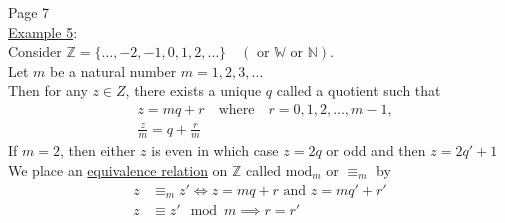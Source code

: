 \documentclass{article}
\begin{document}
\newpage
\begin{flushleft}
    Page 7 \\
    \vspace{1em}
    \underline{Example 5}: \\
    \vspace{1em}
    Consider $\mathbb{Z} = \{ \ldots, -2, -1, 0, 1, 2, \ldots \} \quad (\text{ or } \mathbb{W} \text{ or } \mathbb{N})$. \\
    \vspace{0.5em}
    Let $m$ be a natural number $m = 1,2,3,\ldots$ \\
    \vspace{0.5em}
    Then for any $z \in Z$, there exists a unique $q$ called a quotient such that \begin{align*}
    &\boxed{z = mq + r} \quad \text{where} \quad r = 0, 1, 2, \ldots, m-1, \\
    &\frac{z}{m} = q + \frac{r}{m} 
    \end{align*}
    If $m = 2$, then either $z$ is even in which case $z=2q$ or odd and then $z=2q'+1$ \\
    \vspace{0.5em}
    We place an \underline{equivalence relation} on $\mathbb{Z}$ called $\text{mod}_m$ or $\equiv_m$ by
    \begin{align*}
    z &\equiv_m z' \iff z = mq+r \text{ and } z = mq' +r' \\
    z &\equiv z' \mod m \implies r = r'
    \end{align*}
    
\end{flushleft}
\end{document}
